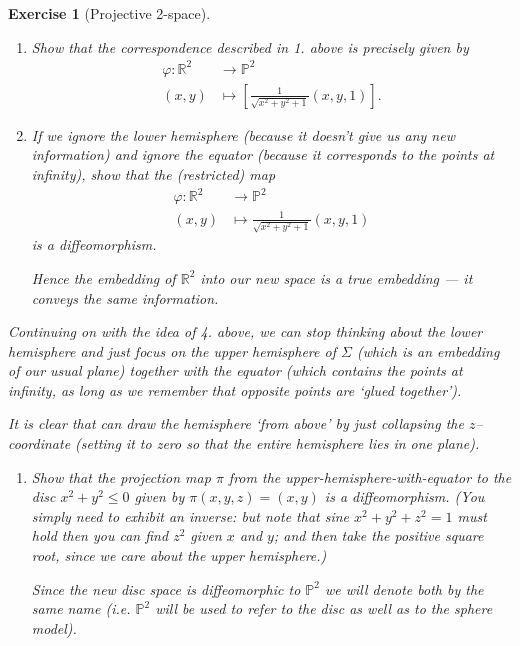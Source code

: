 \documentclass[a4paper,leqno,10pt]{article}
\theoremstyle{exercise}
\newtheorem{Exercise}{Exercise}
\newenvironment{exercise}
  {\begin{mdframed}\begin{Exercise}}
  {\end{Exercise}\end{mdframed}}
\theoremstyle{plain}
\theoremstyle{definition}
\theoremstyle{remark}
\begin{document}
\begin{exercise}[Projective 2-space]
  \begin{enumerate}[resume]
    \item Show that the correspondence described in 1. above is precisely given by
          \begin{align*}
            \varphi : \mathbb{R}^2 &\to \mathbb{P}^2\\
            (x,y) &\mapsto \left[\frac{1}{\sqrt{x^2 + y^2 + 1}} (x,y,1)\right].
          \end{align*}

    \item If we ignore the lower hemisphere (because it doesn't give us any new information)
          and ignore the equator (because it corresponds to the points at infinity), show that the (restricted) map
          \begin{align*}
            \varphi : \mathbb{R}^2 &\to \mathbb{P}^2\\
            (x,y) &\mapsto \frac{1}{\sqrt{x^2 + y^2 + 1}} (x,y,1)
          \end{align*}
          is a diffeomorphism.

          Hence the embedding of $ \mathbb{R}^2 $ into our new space is a \emph{true} embedding --- it conveys the same
          information.
  \end{enumerate}

  Continuing on with the idea of 4. above, we can stop thinking about the lower hemisphere and just focus on the upper
  hemisphere of $ \Sigma $ (which is an embedding of our usual plane) together with the equator (which contains the points
  at infinity, as long as we remember that opposite points are `glued together').

  It is clear that can draw the hemisphere `from above' by just collapsing the $ z$--coordinate (setting it to zero so that the
  entire hemisphere lies in one plane).

  \begin{enumerate}[resume]
    \item Show that the projection map $ \pi $ from the upper-hemisphere-with-equator to the disc $ x^2 + y^2 \leq 0 $ given
          by $ \pi(x,y,z) = (x,y) $ is a diffeomorphism. (You simply need to exhibit an inverse: but note that
          sine $ x^2 + y^2 + z^2 = 1 $ must hold then you can find $ z^2 $ given $ x $ and $ y $; and then take the positive
          square root, since we care about the upper hemisphere.)

          Since the new disc space is diffeomorphic to $ \mathbb{P}^2 $ we will denote both by the same name (i.e. $ \mathbb{P}^2 $ will
          be used to refer to the disc as well as to the sphere model).
  \end{enumerate}


\end{exercise}
\end{document}
